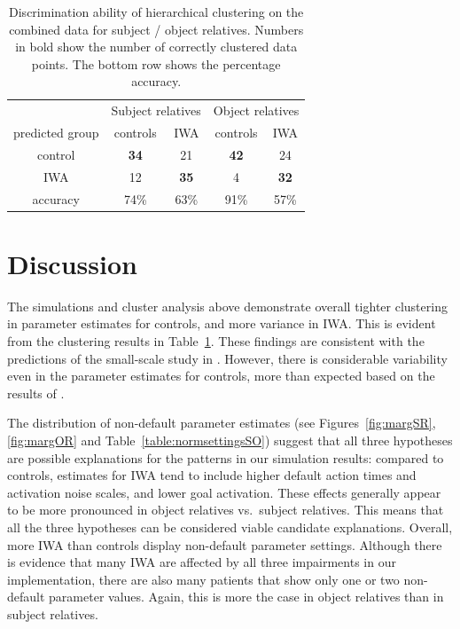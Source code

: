 \documentclass{cambridge7A}\usepackage[]{graphicx}\usepackage[]{color}
\begin{document}
\begin{table}
\begin{tabular}{ccccc}
 &\multicolumn{2}{c}{Subject relatives} & \multicolumn{2}{c}{Object relatives}\\
predicted group &    controls &  IWA & controls & IWA \\ 
         control      &  \textbf{34}             & 21   &        \textbf{42}   & 24\\
         IWA           & 12              & \textbf{35}    &         4    & \textbf{32}\\ 
 \hline        
         accuracy & 74\% & 63\% & 91\% & 57\%
\end{tabular}
\caption{Discrimination ability of hierarchical clustering on the combined data for subject / object relatives. Numbers in bold show the number of correctly clustered data points. The bottom row shows the percentage accuracy.}
  \label{table:hclustSO}
\end{table}


\section{Discussion}

The simulations and cluster analysis above demonstrate overall tighter clustering in parameter estimates for controls, and more variance in IWA. This is evident from the clustering results in Table~\ref{table:hclustSO}.
These findings are consistent with the predictions of the small-scale study in \cite{PatilEtAl2016}. However, there is considerable variability even in the parameter estimates for controls, more than expected based on the results of \cite{PatilEtAl2016}.

The distribution of non-default parameter estimates (see Figures~\ref{fig:margSR}, \ref{fig:margOR} and Table~\ref{table:normsettingsSO})
suggest that all three hypotheses are possible explanations for the patterns in our simulation results: compared to controls, estimates for IWA tend to include higher default action times and activation noise scales, and lower goal activation. These effects generally appear to be more pronounced in object relatives vs.\ subject relatives. This means that all the three hypotheses can be considered viable candidate explanations. 
Overall, more IWA than controls display non-default parameter settings. Although there is evidence that many IWA are affected by all three impairments in our implementation, there are also many patients that show only one or two non-default parameter values. Again, this is more the case in object relatives than in subject relatives.
\end{document}

